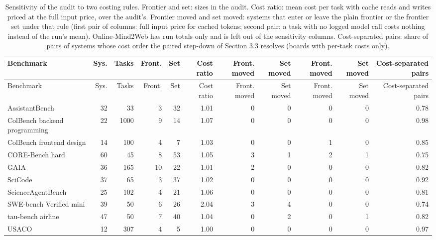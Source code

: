 \begin{longtable}{lrrrrrrrrrr}
\caption{Sensitivity of the audit to two costing rules. Frontier and set: sizes in the audit. Cost ratio: mean cost per task with cache reads and writes priced at the full input price, over the audit's. Frontier moved and set moved: systems that enter or leave the plain frontier or the frontier set under that rule (first pair of columns: full input price for cached tokens; second pair: a task with no logged model call costs nothing instead of the run's mean). Online-Mind2Web has run totals only and is left out of the sensitivity columns. Cost-separated pairs: share of pairs of systems whose cost order the paired step-down of Section 3.3 resolves (boards with per-task costs only).}\label{tab:supp-sensitivity}\\
\toprule
Benchmark & Sys. & Tasks & Front. & Set & Cost ratio & Front. moved & Set moved & Front. moved & Set moved & Cost-separated pairs \\
\midrule
\endfirsthead
\toprule
Benchmark & Sys. & Tasks & Front. & Set & Cost ratio & Front. moved & Set moved & Front. moved & Set moved & Cost-separated pairs \\
\midrule
\endhead
\bottomrule
\endfoot
AssistantBench & 32 & 33 & 3 & 32 & 1.01 & 0 & 0 & 0 & 0 & 0.78 \\
ColBench backend programming & 22 & 1000 & 9 & 14 & 1.07 & 0 & 0 & 0 & 0 & 0.98 \\
ColBench frontend design & 14 & 100 & 4 & 7 & 1.03 & 0 & 0 & 1 & 0 & 0.85 \\
CORE-Bench hard & 60 & 45 & 8 & 53 & 1.05 & 3 & 1 & 2 & 1 & 0.75 \\
GAIA & 36 & 165 & 10 & 22 & 1.01 & 2 & 0 & 0 & 0 & 0.82 \\
SciCode & 37 & 65 & 3 & 37 & 1.02 & 0 & 0 & 0 & 0 & 0.92 \\
ScienceAgentBench & 25 & 102 & 4 & 21 & 1.06 & 0 & 0 & 0 & 0 & 0.81 \\
SWE-bench Verified mini & 39 & 50 & 6 & 26 & 2.04 & 3 & 4 & 0 & 0 & 0.74 \\
tau-bench airline & 47 & 50 & 7 & 40 & 1.04 & 0 & 2 & 0 & 1 & 0.82 \\
USACO & 12 & 307 & 4 & 5 & 1.00 & 0 & 0 & 0 & 0 & 0.97 \\
\end{longtable}
